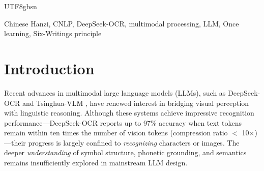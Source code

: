 \documentclass[conference]{IEEEtran}
\begin{document}
\begin{CJK*}{UTF8}{gbsn}


\begin{IEEEkeywords}
Chinese Hanzi, CNLP, DeepSeek-OCR, multimodal processing, LLM, Once learning, Six-Writings principle
\end{IEEEkeywords}

\section{Introduction}

Recent advances in multimodal large language models (LLMs), such as DeepSeek-OCR \cite{wei2025deepseek} and Tsinghua-VLM \cite{wang2024cogvlm}, have renewed interest in bridging visual perception with linguistic reasoning. Although these systems achieve impressive recognition performance—DeepSeek-OCR reports up to 97\% accuracy when text tokens remain within ten times the number of vision tokens (compression ratio $<$ 10×) \cite{wei2025deepseek}—their progress is largely confined to \emph{recognizing} characters or images. The deeper \emph{understanding} of symbol structure, phonetic grounding, and semantics remains insufficiently explored in mainstream LLM design.


\end{CJK*}
\end{document}
